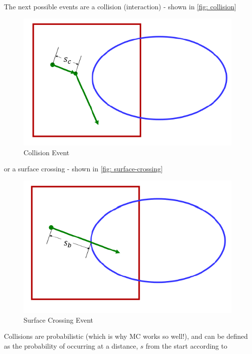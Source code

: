 \documentclass[12pt]{article}
\begin{document}
The next possible events are a collision (interaction) - shown in \autoref{fig: collision}

\begin{figure}[h!]
\begin{center}
\includegraphics[scale=0.80]{../figs/collision.png}
\caption{Collision Event}
\label{fig: collision}
\end{center}
\end{figure}

or a surface crossing - shown in \autoref{fig: surface-crossing}

\begin{figure}[h!]
\begin{center}
\includegraphics[scale=0.80]{../figs/surface-crossing.png}
\caption{Surface Crossing Event}
\label{fig: surface-crossing}
\end{center}
\end{figure}

Collisions are probabilistic (which is why MC works so well!), and can be defined as the probability of occurring at a distance, $s$ from the start according to
\end{document}

